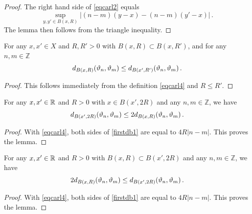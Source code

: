 \begin{proof}
\leanok
    The right hand side of \eqref{eqcarl2} equals
    $$
        \sup_{y,y'\in B(x,R)}|(n-m)(y-x)-(n-m)(y'-x)|\,.
    $$
    The lemma then follows from the triangle inequality.
\end{proof}

\begin{lemma}
\label{frequency-monotone}
\leanok
{}

    For any $x, x' \in X$ and $R, R' > 0$ with $B(x,R) \subset B(x, R')$, and for any $n, m \in \mathbb{Z}$
    $$
        d_{B(x,R)}({\vartheta}_n, {\vartheta}_m) \le d_{B(x',R')}({\vartheta}_n, {\vartheta}_m)\,.
    $$
\end{lemma}

\begin{proof}
\leanok
    This follows immediately from the definition \eqref{eqcarl4} and $R \le R'$.
\end{proof}

\begin{lemma}
\label{frequency-ball-doubling}
\leanok
{}
  For any $x,x'\in {\mathbb{R}}$ and $R>0$ with
   $x\in B(x',2R)$ and any $n,m\in \mathbb{Z}$, we have
\begin{equation}\label{firstdb1}
    d_{B(x',2R)}({\vartheta}_n,{\vartheta}_m)\le 2 d_{B(x,R)}({\vartheta}_n,{\vartheta}_m) \, .
\end{equation}
\end{lemma}

\begin{proof}
\leanok
With \eqref{eqcarl4}, both sides of \eqref{firstdb1} are equal to $4R|n-m|$. This proves the lemma.
\end{proof}

\begin{lemma}
\label{frequency-ball-growth}
\leanok
{}
    For any $x,x'\in {\mathbb{R}}$ and $R>0$ with
   $B(x,R)\subset B(x',2R)$ and any $n,m\in \mathbb{Z}$, we have
\begin{equation}\label{seconddb1}
    2d_{B(x,R)}({\vartheta}_n,{\vartheta}_m)\le d_{B(x',2R)}({\vartheta}_n,{\vartheta}_m) \, .
\end{equation}
\end{lemma}

\begin{proof}
\leanok
    With \eqref{eqcarl4}, both sides of \eqref{firstdb1} are equal to $4R|n-m|$. This proves the lemma.
\end{proof}

